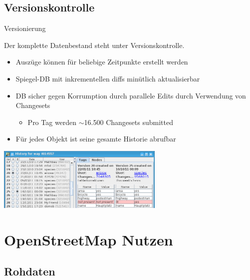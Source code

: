 \documentclass{beamer}
\begin{document}
\subsection{Versionskontrolle}

\begin{frame}{Versionierung}

Der komplette Datenbestand steht unter Versionskontrolle.
\begin{itemize}
  \item Auszüge können für beliebige Zeitpunkte erstellt werden
  \item Spiegel-DB mit inkrementellen diffs minütlich aktualisierbar
  \item DB sicher gegen Korrumption durch parallele Edits durch Verwendung von Changesets
  \begin{itemize}
    \item Pro Tag werden $\sim$16.500 Changesets submitted
  \end{itemize}
  \item Für jedes Objekt ist seine gesamte Historie abrufbar
\end{itemize}

 \hfill \includegraphics[width=8cm]{history.png}

\end{frame}



\section{OpenStreetMap Nutzen}

\subsection{Rohdaten}
\end{document}
